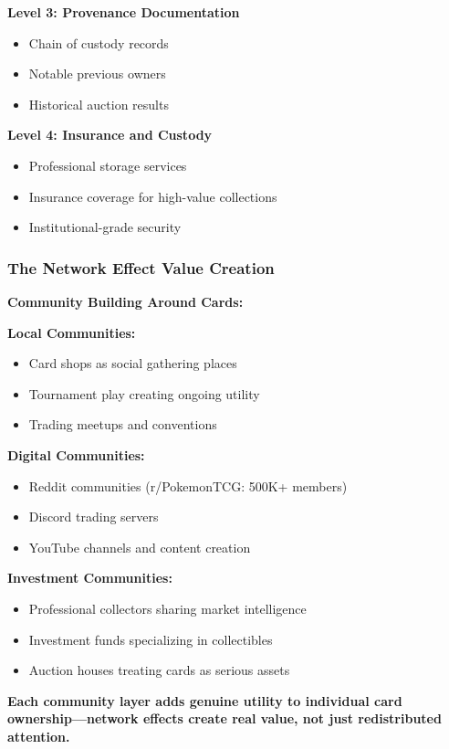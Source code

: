 \documentclass[11pt,oneside]{book}
\begin{document}
{{{{{{\textbf{Level 3: Provenance Documentation}
\begin{itemize}
\item Chain of custody records
\item Notable previous owners
\item Historical auction results
\end{itemize}

\textbf{Level 4: Insurance and Custody}
\begin{itemize}
\item Professional storage services
\item Insurance coverage for high-value collections
\item Institutional-grade security
\end{itemize}

\subsubsection{The Network Effect Value Creation}

\textbf{Community Building Around Cards:}

\textbf{Local Communities:}
\begin{itemize}
\item Card shops as social gathering places
\item Tournament play creating ongoing utility
\item Trading meetups and conventions
\end{itemize}

\textbf{Digital Communities:}
\begin{itemize}
\item Reddit communities (r/PokemonTCG: 500K+ members)
\item Discord trading servers
\item YouTube channels and content creation
\end{itemize}

\textbf{Investment Communities:}
\begin{itemize}
\item Professional collectors sharing market intelligence
\item Investment funds specializing in collectibles
\item Auction houses treating cards as serious assets
\end{itemize}

\textbf{Each community layer adds genuine utility to individual card ownership—network effects create real value, not just redistributed attention.}

}}}}}}
\end{document}
